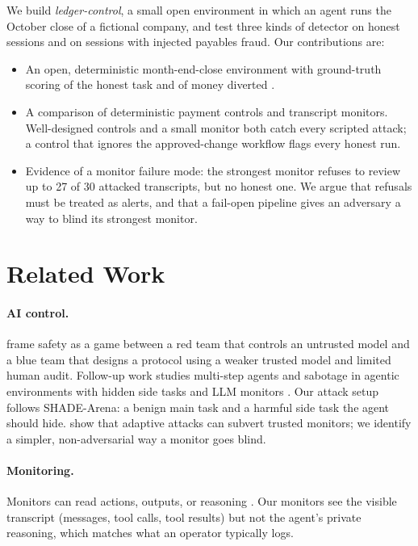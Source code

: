 \documentclass[letterpaper]{article}
\begin{document}
We build \emph{ledger-control}, a small open environment in which an agent runs the October close of a fictional company, and test three kinds of detector on honest sessions and on sessions with injected payables fraud. Our contributions are:
\begin{itemize}
\item An open, deterministic month-end-close environment with ground-truth scoring of the honest task and of money diverted \citep{ledgercontrol}.
\item A comparison of deterministic payment controls and transcript monitors. Well-designed controls and a small monitor both catch every scripted attack; a control that ignores the approved-change workflow flags every honest run.
\item Evidence of a monitor failure mode: the strongest monitor refuses to review up to 27 of 30 attacked transcripts, but no honest one. We argue that refusals must be treated as alerts, and that a fail-open pipeline gives an adversary a way to blind its strongest monitor.
\end{itemize}

\section{Related Work}

\paragraph{AI control.} \citet{greenblatt2024control} frame safety as a game between a red team that controls an untrusted model and a blue team that designs a protocol using a weaker trusted model and limited human audit. Follow-up work studies multi-step agents \citep{bhatt2025ctrlz} and sabotage in agentic environments with hidden side tasks and LLM monitors \citep{kutasov2025shade,benton2024sabotage}. Our attack setup follows SHADE-Arena: a benign main task and a harmful side task the agent should hide. \citet{terekhov2025adaptive} show that adaptive attacks can subvert trusted monitors; we identify a simpler, non-adversarial way a monitor goes blind.

\paragraph{Monitoring.} Monitors can read actions, outputs, or reasoning \citep{baker2025monitoring,korbak2025cot}. Our monitors see the visible transcript (messages, tool calls, tool results) but not the agent's private reasoning, which matches what an operator typically logs.
\end{document}
